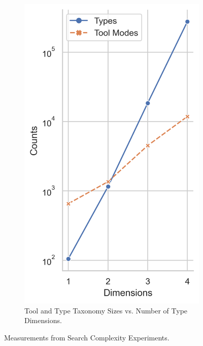 \begin{figure}[h]
\begin{subfigure}[t]{.28\textwidth}
        \includegraphics[width=\textwidth]{Tex//images/complexity_right.png}
        \caption{Tool and Type Taxonomy Sizes vs. Number of Type Dimensions.}
        \label{fig:native_ape_complex_right}
    \end{subfigure}
    \caption{Measurements from Search Complexity Experiments.}
    \label{fig:native_ape_double_complexity}
\end{figure}

